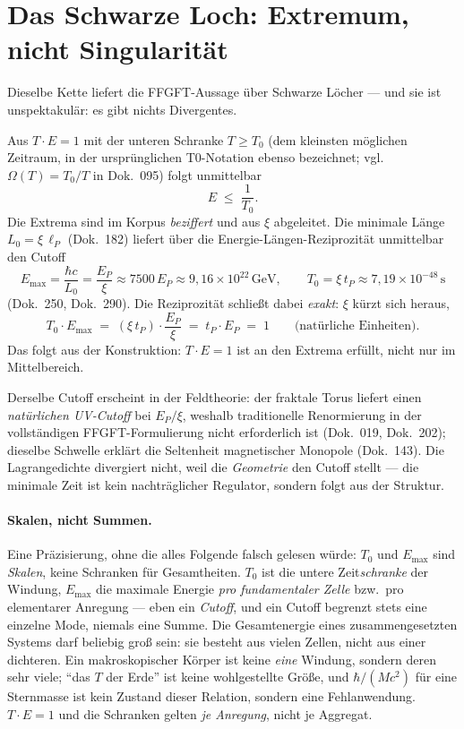 \section{Das Schwarze Loch: Extremum, nicht Singularität}

Dieselbe Kette liefert die FFGFT-Aussage über Schwarze Löcher --- und sie ist
unspektakulär: es gibt nichts Divergentes.

Aus $T\cdot E = 1$ mit der unteren Schranke $T \ge T_0$ (dem kleinsten möglichen Zeitraum, in der
ursprünglichen T0-Notation ebenso bezeichnet; vgl.\ $\Omega(T)=T_0/T$ in Dok.~095) folgt
unmittelbar
\begin{equation}
E \;\le\; \frac{1}{T_0}.
\end{equation}
Die Extrema sind im Korpus \emph{beziffert} und aus $\xi$ abgeleitet. Die minimale Länge
$L_0 = \xi\,\ell_P$ (Dok.~182) liefert über die Energie-Längen-Reziprozität unmittelbar den
Cutoff
\begin{equation}
E_\text{max} = \frac{\hbar c}{L_0} = \frac{E_P}{\xi} \approx 7500\,E_P \approx 9{,}16\times10^{22}\,\text{GeV},
\qquad
T_0 = \xi\, t_P \approx 7{,}19\times10^{-48}\,\text{s}
\end{equation}
(Dok.~250, Dok.~290). Die Reziprozität schließt dabei \emph{exakt}: $\xi$ kürzt sich heraus,
\begin{equation}
T_0 \cdot E_\text{max} \;=\; (\xi\, t_P)\cdot\frac{E_P}{\xi} \;=\; t_P \cdot E_P \;=\; 1
\qquad\text{(natürliche Einheiten)} .
\end{equation}
Das folgt aus der Konstruktion: $T\cdot E = 1$ ist an den Extrema
erfüllt, nicht nur im Mittelbereich.

Derselbe Cutoff erscheint in der Feldtheorie: der fraktale Torus liefert einen \emph{natürlichen
UV-Cutoff} bei $E_P/\xi$, weshalb traditionelle Renormierung in der vollständigen
FFGFT-Formulierung nicht erforderlich ist (Dok.~019, Dok.~202); dieselbe Schwelle erklärt die
Seltenheit magnetischer Monopole (Dok.~143). Die Lagrangedichte divergiert nicht, weil die
\emph{Geometrie} den Cutoff stellt --- die minimale Zeit ist kein nachträglicher Regulator,
sondern folgt aus der Struktur.

\paragraph{Skalen, nicht Summen.} Eine Präzisierung, ohne die alles Folgende falsch gelesen
würde: $T_0$ und $E_\text{max}$ sind \emph{Skalen}, keine Schranken für Gesamtheiten. $T_0$ ist die
untere Zeit\emph{schranke} der Windung, $E_\text{max}$ die maximale Energie \emph{pro
fundamentaler Zelle} bzw.\ pro elementarer Anregung --- eben ein \emph{Cutoff}, und ein Cutoff
begrenzt stets eine einzelne Mode, niemals eine Summe. Die Gesamtenergie eines zusammengesetzten
Systems darf beliebig groß sein: sie besteht aus vielen Zellen, nicht aus einer dichteren. Ein
makroskopischer Körper ist keine \emph{eine} Windung, sondern deren sehr viele; \enquote{das $T$ der
Erde} ist keine wohlgestellte Größe, und $\hbar/(M c^2)$ für eine Sternmasse ist kein Zustand dieser
Relation, sondern eine Fehlanwendung. $T\cdot E = 1$ und die Schranken gelten \emph{je Anregung},
nicht je Aggregat.

